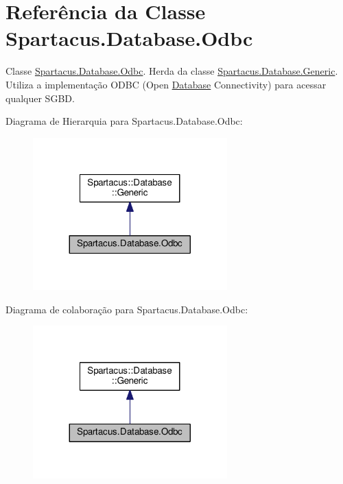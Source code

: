 \hypertarget{classSpartacus_1_1Database_1_1Odbc}{\section{Referência da Classe Spartacus.\+Database.\+Odbc}
\label{classSpartacus_1_1Database_1_1Odbc}
}


Classe \hyperlink{classSpartacus_1_1Database_1_1Odbc}{Spartacus.\+Database.\+Odbc}. Herda da classe \hyperlink{classSpartacus_1_1Database_1_1Generic}{Spartacus.\+Database.\+Generic}. Utiliza a implementação O\+D\+B\+C (Open \hyperlink{namespaceSpartacus_1_1Database}{Database} Connectivity) para acessar qualquer S\+G\+B\+D.  




Diagrama de Hierarquia para Spartacus.\+Database.\+Odbc\+:\nopagebreak
\begin{figure}[H]
\begin{center}
\leavevmode
\includegraphics[width=212pt]{classSpartacus_1_1Database_1_1Odbc__inherit__graph}
\end{center}
\end{figure}


Diagrama de colaboração para Spartacus.\+Database.\+Odbc\+:\nopagebreak
\begin{figure}[H]
\begin{center}
\leavevmode
\includegraphics[width=212pt]{classSpartacus_1_1Database_1_1Odbc__coll__graph}
\end{center}
\end{figure}
